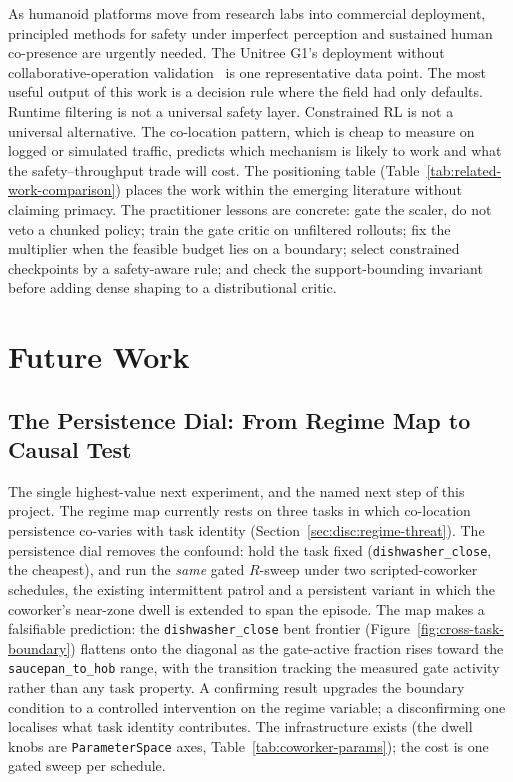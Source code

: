 \documentclass[11pt,a4paper]{report}
\begin{document}
\noindent
As humanoid platforms move from research labs into commercial
deployment, principled methods for safety under imperfect perception
and sustained human co-presence are urgently needed. The Unitree G1's
deployment without collaborative-operation
validation~\cite{unitree_g1,hartmann2026iso} is one representative
data point. The most useful output of this work is a decision rule
where the field had only defaults. Runtime filtering is not a universal
safety layer. Constrained RL is not a universal alternative. The
co-location pattern, which is cheap to measure on logged or simulated
traffic, predicts which mechanism is likely to work and what the
safety--throughput trade will cost. The positioning table
(Table~\ref{tab:related-work-comparison}) places the work within the
emerging literature without claiming primacy. The practitioner lessons
are concrete: gate the scaler, do not veto a chunked policy; train the
gate critic on unfiltered rollouts; fix the multiplier when the
feasible budget lies on a boundary; select constrained checkpoints by
a safety-aware rule; and check the support-bounding invariant before
adding dense shaping to a distributional critic.


\section{Future Work}
\label{ch:future}
\label{sec:conclusion:fw}

\subsection{The Persistence Dial: From Regime Map to Causal Test}
\label{sec:fw:persistence-dial}

The single highest-value next experiment, and the named next step of
this project. The regime map currently rests on three tasks in which
co-location persistence co-varies with task identity
(Section~\ref{sec:disc:regime-threat}). The persistence dial removes
the confound: hold the task fixed (\texttt{dishwasher\_close}, the
cheapest), and run the \emph{same} gated $R$-sweep under two
scripted-coworker schedules, the existing intermittent patrol and a
persistent variant in which the coworker's near-zone dwell is
extended to span the episode. The map makes a falsifiable
prediction: the \texttt{dishwasher\_close} bent frontier
(Figure~\ref{fig:cross-task-boundary}) flattens onto the diagonal as
the gate-active fraction rises toward the \texttt{saucepan\_to\_hob} range, with the
transition tracking the measured gate activity rather than any task
property. A confirming result upgrades the boundary condition to a
controlled intervention on the regime variable; a disconfirming one
localises what task identity contributes. The infrastructure exists
(the dwell knobs are \texttt{ParameterSpace} axes,
Table~\ref{tab:coworker-params}); the cost is one gated sweep per
schedule.
\end{document}
